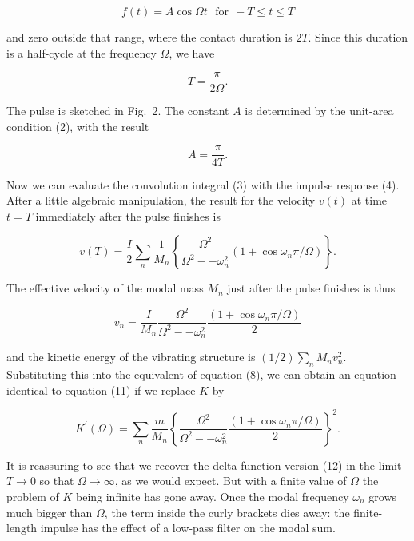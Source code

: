   $$f(t)=A \cos \Omega t \mathrm{~~~for~~} -T \le t \le T \tag{14}$$ 

  and zero outside that range, where the contact duration is $2T$. Since this 
  duration is a half-cycle at the frequency $\Omega$, we have 

  $$T=\dfrac{\pi}{2 \Omega}. \tag{15}$$ 

  The pulse is sketched in Fig.\ 2. The constant $A$ is determined by the 
  unit-area condition (2), with the result 

  $$A=\dfrac{\pi}{4T}. \tag{16}$$ 


  Now we can evaluate the convolution integral (3) with the impulse response 
  (4). After a little algebraic manipulation, the result for the velocity 
  $v(t)$ at time $t=T$ immediately after the pulse finishes is 

  $$v(T)=\dfrac{I}{2} \sum_n{\dfrac{1}{M_n} \left\lbrace 
  \dfrac{\Omega^2}{\Omega^2 -- \omega_n^2} (1 + \cos \omega_n \pi/\Omega) 
  \right\rbrace} . \tag{17}$$ 

  The effective velocity of the modal mass $M_n$ just after the pulse finishes 
  is thus 

  $$v_n=\dfrac{I}{M_n} \dfrac{\Omega^2}{\Omega^2 -- \omega_n^2} \dfrac{(1 + 
  \cos \omega_n \pi/\Omega)}{2} \tag{18}$$ 

  and the kinetic energy of the vibrating structure is $(1/2)\sum_n{M_n 
  v_n^2}$. Substituting this into the equivalent of equation (8), we can obtain 
  an equation identical to equation (11) if we replace $K$ by 

  $$K^\prime (\Omega) = \sum_n{\dfrac{m}{M_n} \left\lbrace 
  \dfrac{\Omega^2}{\Omega^2 -- \omega_n^2} \dfrac{(1 + \cos \omega_n 
  \pi/\Omega)}{2} \right\rbrace^2} . \tag{19}$$ 

  It is reassuring to see that we recover the delta-function version (12) in 
  the limit $T \rightarrow 0$ so that $\Omega \rightarrow\infty$, as we would 
  expect. But with a finite value of $\Omega$ the problem of $K$ being infinite 
  has gone away. Once the modal frequency $\omega_n$ grows much bigger than 
  $\Omega$, the term inside the curly brackets dies away: the finite-length 
  impulse has the effect of a low-pass filter on the modal sum. 

